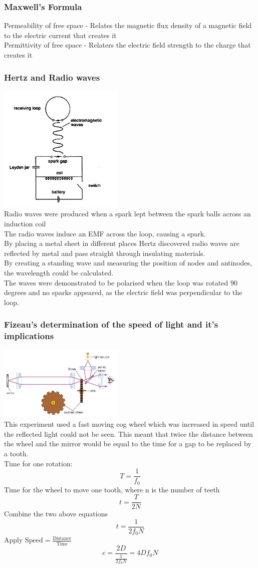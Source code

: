 \documentclass[12pt]{article}
\begin{document}
\subsubsection{Maxwell's Formula}
Permeability of free space - Relates the magnetic flux density of a magnetic field to the electric current that creates it\\
Permittivity of free space - Relaters the electric field strength to the charge that creates it
\subsubsection{Hertz and Radio waves}
\includegraphics[width=6cm]{hertz_1.jpg}\\
Radio waves were produced when a spark lept between the spark balls across an induction coil\\
The radio waves induce an EMF across the loop, causing a spark.\\
By placing a metal sheet in different places Hertz discovered radio waves are reflected by metal and pass straight through insulating materials.\\
By creating a standing wave and measuring the position of nodes and antinodes, the wavelength could be calculated.\\
The waves were demonstrated to be polarised when the loop was rotated 90 degrees and no sparks appeared, as the electric field was perpendicular to the loop.
\newpage
\subsubsection{Fizeau's determination of the speed of light and it's implications}
\includegraphics[width=6cm]{fizeau.jpg}\\
This experiment used a fast moving cog wheel which was increased in speed until the reflected light could not be seen. This meant that twice the distance between the wheel and the mirror would be equal to the time for a gap to be replaced by a tooth.\\
Time for one rotation:
$$T=\frac{1}{f_0}$$
Time for the wheel to move one tooth, where n is the number of teeth
$$t=\frac{T}{2N}$$
Combine the two above equations
$$t=\frac{1}{2f_0N}$$
Apply $\textrm{Speed}=\frac{\textrm{Distance}}{\textrm{Time}}$
$$c=\frac{2D}{\frac{1}{2f_0N}}=4Df_0N$$
\end{document}
